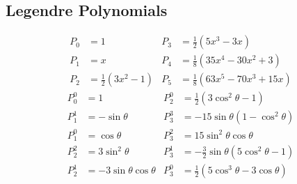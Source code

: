 \subsection{Legendre Polynomials}
\noindent\begin{align*}
    P_{0} & =1                     & P_{3} & =\frac{1}{2}(5x^{3}-3x)           \\
    P_{1} & =x                     & P_{4} & =\frac{1}{8}(35x^{4}-30x^{2}+3)   \\
    P_{2} & =\frac{1}{2}(3x^{2}-1) & P_{5} & =\frac{1}{8}(63x^{5}-70x^{3}+15x)
\end{align*}
\noindent\begin{align*}
    P_{0}^{0} & =1                       & P_{2}^{0} & =\frac{1}{2}(3 \cos^{2}\theta-1)             \\
    P_{1}^{1} & =-\sin\theta             & P_{3}^{3} & =-15 \sin\theta(1-\cos^{2}\theta)            \\
    P_{1}^{0} & =\cos\theta              & P_{3}^{2} & =15 \sin^{2}\theta \cos\theta                \\
    P_{2}^{2} & =3 \sin^{2}\theta        & P_{3}^{1} & =-\frac{3}{2}\sin\theta (5 \cos^{2}\theta-1) \\
    P_{2}^{1} & =-3 \sin\theta\cos\theta & P_{3}^{0} & =\frac{1}{2} (5 \cos^{3}\theta-3 \cos\theta)
\end{align*}